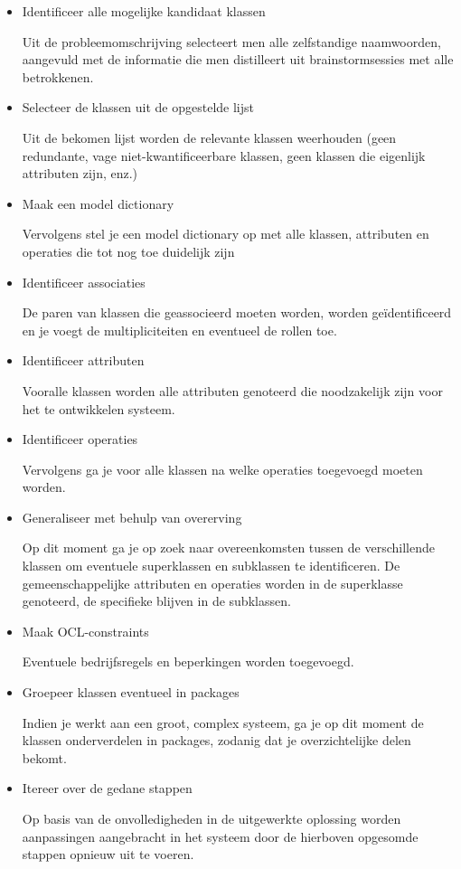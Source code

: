 \begin{itemize}
    \item Identificeer alle mogelijke kandidaat klassen
    
    Uit de probleemomschrijving selecteert men alle zelfstandige naamwoorden, aangevuld met de informatie die men distilleert uit brainstormsessies met alle betrokkenen.
    \item Selecteer de klassen uit de opgestelde lijst
    
    Uit de bekomen lijst worden de relevante klassen weerhouden (geen redundante, vage niet-kwantificeerbare klassen, geen klassen die eigenlijk attributen zijn, enz.)
    \item Maak een model dictionary
    
    Vervolgens stel je een model dictionary op met alle klassen, attributen en operaties die tot nog toe duidelijk zijn
    \item Identificeer associaties
    
    De paren van klassen die geassocieerd moeten worden, worden geïdentificeerd en je voegt de multipliciteiten en eventueel de rollen toe.
    \item Identificeer attributen
    
    Vooralle klassen worden alle attributen genoteerd die noodzakelijk zijn voor het te ontwikkelen systeem.
    \item Identificeer operaties
    
    Vervolgens ga je voor alle klassen na welke operaties toegevoegd moeten worden.
    \item Generaliseer met behulp van overerving
    
    Op dit moment ga je op zoek naar overeenkomsten tussen de verschillende klassen om eventuele superklassen en subklassen te identificeren. De gemeenschappelijke attributen en operaties worden in de superklasse genoteerd, de specifieke blijven in de subklassen.

\item Maak OCL-constraints

Eventuele bedrijfsregels en beperkingen worden toegevoegd.

\item Groepeer klassen eventueel in packages

Indien je werkt aan een groot, complex systeem, ga je op dit moment de klassen onderverdelen in packages, zodanig dat je overzichtelijke delen bekomt.
\item Itereer over de gedane stappen

Op basis van de onvolledigheden in de uitgewerkte oplossing worden aanpassingen aangebracht in het systeem door de hierboven opgesomde stappen opnieuw uit te voeren.
\end{itemize}

